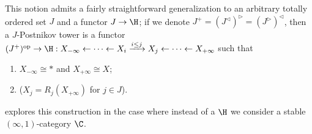 \documentclass[12pt]{amsart}
\begin{document}
\begin{remark}
This notion admits a fairly straightforward generalization to an arbitrary totally ordered set $J$ and a functor $J \to \H$; if we denote $J^+ = (J^\lhd)^\rhd = (J^\rhd)^\lhd$, then a $J$-Postnikov tower is a functor $(J^+)^\text{op} \to \H: X_{-\infty} \leftarrow \cdots \leftarrow X_i \xrightarrow{i\le j} X_j \leftarrow \cdots \leftarrow X_{+\infty}$ such that 
	\begin{enumerate}
		\item $X_{-\infty}\cong *$ and $X_{+\infty}\cong X$;
		\item ($X_j = R_j(X_{+\infty})$ for $j\in J$).
	\end{enumerate}
\cite{heart} explores this construction in the case where instead of a \inftop $\H$ we consider a stable $(\infty,1)$-category $\C$.
\end{remark}
\end{document}
